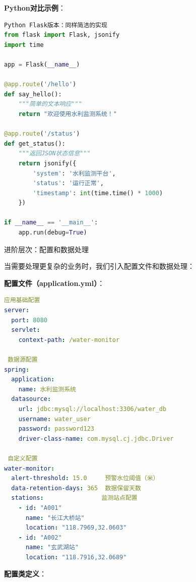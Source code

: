 \textbf{Python对比示例}：

\begin{lstlisting}[language=Python]
 Python Flask版本：同样简洁的实现
from flask import Flask, jsonify
import time

app = Flask(__name__)

@app.route('/hello')
def say_hello():
    """简单的文本响应"""
    return "欢迎使用水利监测系统！"

@app.route('/status')
def get_status():
    """返回JSON状态信息"""
    return jsonify({
        'system': '水利监测平台',
        'status': '运行正常',
        'timestamp': int(time.time() * 1000)
    })

if __name__ == '__main__':
    app.run(debug=True)
\end{lstlisting}

 进阶层次：配置和数据处理

当需要处理更复杂的业务时，我们引入配置文件和数据处理：

\textbf{配置文件（application.yml）}：

\begin{lstlisting}[language=Yaml]
 应用基础配置
server:
  port: 8080
  servlet:
    context-path: /water-monitor

 数据源配置
spring:
  application:
    name: 水利监测系统
  datasource:
    url: jdbc:mysql://localhost:3306/water_db
    username: water_user
    password: password123
    driver-class-name: com.mysql.cj.jdbc.Driver

 自定义配置
water-monitor:
  alert-threshold: 15.0     预警水位阈值（米）
  data-retention-days: 365  数据保留天数
  stations:                监测站点配置
    - id: "A001"
      name: "长江大桥站"
      location: "118.7969,32.0603"
    - id: "A002"  
      name: "玄武湖站"
      location: "118.7916,32.0689"
\end{lstlisting}

\textbf{配置类定义}：

